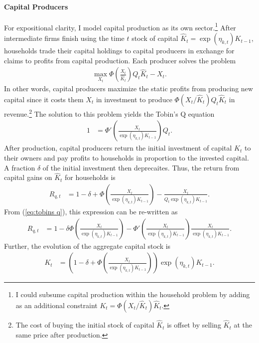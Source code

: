 \documentclass[12 pt, oneside]{article}
\theoremstyle{definition}
\theoremstyle{definition}
\theoremstyle{definition}
\begin{document}
\paragraph{Capital Producers}
For expositional clarity, I model capital production as its own sector.\footnote{I could subsume capital production within the household problem by adding as an additional constraint $K_t = \Phi(X_t/\hat{K}_t)\hat{K}_t$.}
After intermediate firms finish using the time $t$ stock of capital $\hat{K}_t = \exp(\eta_{k, t})K_{t - 1}$,  households trade their capital holdings to capital producers in exchange for claims to profits from capital production. Each producer solves the problem
\begin{align}
  \max_{X_t} \Phi\left(\frac{X_t}{\hat{K}_t}\right)Q_t\hat{K}_t - X_t.
\end{align}
In other words, capital producers maximize the static profits from producing new capital since it costs them $X_t$ in investment to produce $\Phi(X_t / \hat{K}_t)Q_t \hat{K}_t$ in revenue.\footnote{The cost of buying the initial stock of capital $\hat{K}_t$ is offset by selling $\hat{K}_t$ at the same price after production.}
The solution to this problem yields the Tobin's Q equation
\begin{align}\label{eq:tobins q}
  1 & = \Phi'\left(\frac{X_t}{\exp(\eta_{k, t})K_{t - 1}}\right) Q_t.
\end{align}
After production, capital producers return the initial investment of capital $\hat{K}_t$ to their owners and pay profits to households in proportion to the invested capital. A fraction $\delta$ of the initial investment then deprecaites. Thus, the return from capital gains on $\hat{K}_t$ for households is
\begin{align*}
  R_{q, t} & = 1 - \delta + \Phi\left(\frac{X_t}{\exp(\eta_{k, t})K_{t - 1}}\right) - \frac{X_t}{Q_t \exp(\eta_{k, t})K_{t- 1}}.
\end{align*}
From (\ref{eq:tobins q}), this expression can be re-written as
\begin{align}\label{eq:Rq defn}
  R_{q, t} & = 1 - \delta \Phi\left(\frac{X_t}{\exp(\eta_{k, t})K_{t - 1}}\right) - \Phi'\left(\frac{X_t}{\exp(\eta_{k, t})K_{t - 1}}\right)\frac{X_t}{\exp(\eta_{k, t})K_{t - 1}}.
\end{align}
Further, the evolution of the aggregate capital stock is
\begin{align}
    \label{eq:capital accumulation equation}
  K_t & = \left(1 - \delta + \Phi\left(\frac{X_t}{\exp(\eta_{k, t})K_{t - 1}}\right)\right)\exp(\eta_{k, t})K_{t - 1}.
\end{align}
\end{document}

